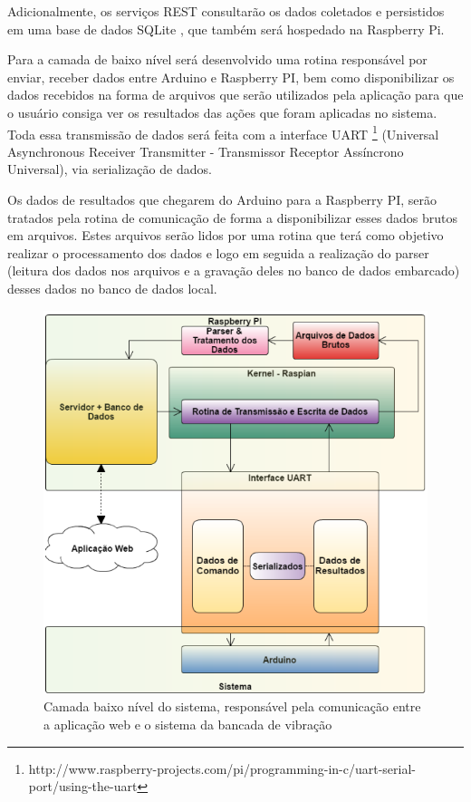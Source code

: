Adicionalmente, os serviços REST consultarão os dados coletados e persistidos em uma base de dados SQLite , que também será hospedado
na Raspberry Pi.

Para a camada de baixo nível será desenvolvido uma rotina responsável por enviar, receber dados entre Arduino e Raspberry PI, bem 
como disponibilizar os dados recebidos na forma de arquivos que serão utilizados pela aplicação para que o usuário consiga ver os 
resultados das ações que foram aplicadas no sistema. Toda essa transmissão de dados será feita com a interface UART \footnote{http://www.raspberry-projects.com/pi/programming-in-c/uart-serial-port/using-the-uart}
(Universal Asynchronous Receiver Transmitter - Transmissor Receptor Assíncrono Universal), via serialização de dados.

Os dados de resultados que chegarem do Arduino para a Raspberry PI, serão tratados pela rotina de comunicação de forma a 
disponibilizar esses dados brutos em arquivos. Estes arquivos serão lidos por uma rotina que terá como objetivo realizar o 
processamento dos dados e logo em seguida a realização do parser (leitura dos dados nos arquivos e a gravação deles no banco 
de dados embarcado) desses dados no banco de dados local.

\begin{figure}[!ht]
\centering
\includegraphics[scale=0.5]{figuras/sistema.png}
\caption{Camada baixo nível do sistema, responsável pela comunicação entre a aplicação web e o sistema da bancada de vibração}
\label{fig:sistema}
\end{figure}

